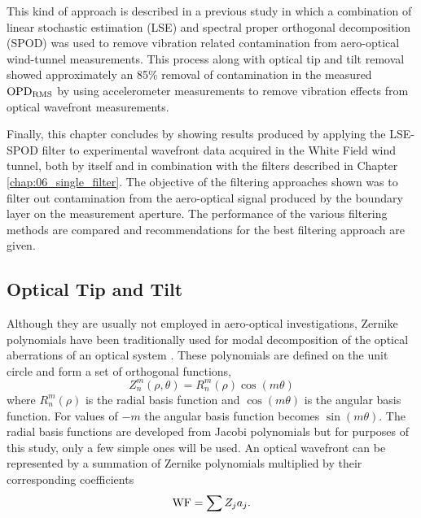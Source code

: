 This kind of approach is described in a previous study \cite{DeLucca-2014-RAJvGdv7} in which a combination of linear stochastic estimation (LSE) and spectral proper orthogonal decomposition (SPOD) was used to remove vibration related contamination from aero-optical wind-tunnel measurements.
This process along with optical tip and tilt removal showed approximately an 85\% removal of contamination in the measured $\operatorname{OPD_{RMS}}$ by using accelerometer measurements to remove vibration effects from optical wavefront measurements.

Finally, this chapter concludes by showing results produced by applying the LSE-SPOD filter to experimental wavefront data acquired in the White Field wind tunnel, both by itself and in combination with the filters described in Chapter \ref{chap:06_single_filter}. The objective of the filtering approaches shown was to filter out contamination from the aero-optical signal produced by the boundary layer on the measurement aperture. The performance of the various filtering methods are compared and recommendations for the best filtering approach are given.

\subsection{Optical Tip and Tilt}
Although they are usually not employed in aero-optical investigations, Zernike polynomials have been traditionally used for modal decomposition of the optical aberrations of an optical system \cite{Born-1965-HHGYgjdH}.
These polynomials are defined on the unit circle and form a set of orthogonal functions,
\begin{equation}
  Z_n^m(\rho,\theta) = R_n^m(\rho)\cos(m\theta)
  \label{eqn:07_zernike}
\end{equation}
where $R_n^m(\rho)$ is the radial basis function and $\cos(m\theta)$ is the angular basis function.
For values of $-m$ the angular basis function becomes $\sin(m\theta)$.
The radial basis functions are developed from Jacobi polynomials but for purposes of this study, only a few simple ones will be used.
An optical wavefront can be represented by a summation of Zernike polynomials multiplied by their corresponding coefficients
\begin{equation}
  \operatorname{WF} = \sum Z_ja_j \textrm{.}
  \label{eqn:07_zernike_coeff}
\end{equation}

